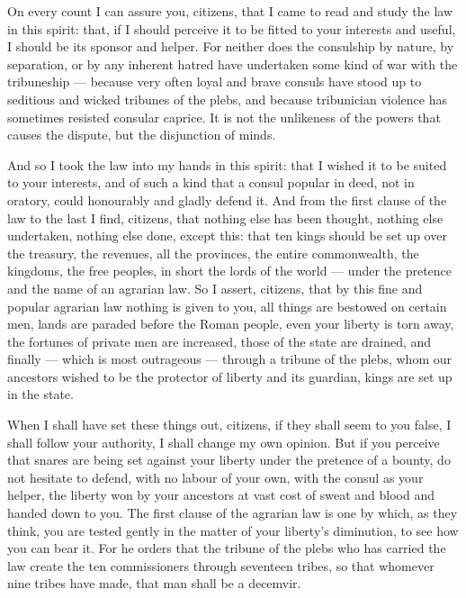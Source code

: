  On every count I can assure you, citizens, that I came to read and study the law in this spirit: that, if I should perceive it to be fitted to your interests and useful, I should be its sponsor and helper. For neither does the consulship by nature, by separation, or by any inherent hatred have undertaken some kind of war with the tribuneship --- because very often loyal and brave consuls have stood up to seditious and wicked tribunes of the plebs, and because tribunician violence has sometimes resisted consular caprice. It is not the unlikeness of the powers that causes the dispute, but the disjunction of minds.

 And so I took the law into my hands in this spirit: that I wished it to be suited to your interests, and of such a kind that a consul popular in deed, not in oratory, could honourably and gladly defend it. And from the first clause of the law to the last I find, citizens, that nothing else has been thought, nothing else undertaken, nothing else done, except this: that ten kings should be set up over the treasury, the revenues, all the provinces, the entire commonwealth, the kingdoms, the free peoples, in short the lords of the world --- under the pretence and the name of an agrarian law. So I assert, citizens, that by this fine and popular agrarian law nothing is given to you, all things are bestowed on certain men, lands are paraded before the Roman people, even your liberty is torn away, the fortunes of private men are increased, those of the state are drained, and finally --- which is most outrageous --- through a tribune of the plebs, whom our ancestors wished to be the protector of liberty and its guardian, kings are set up in the state.

 When I shall have set these things out, citizens, if they shall seem to you false, I shall follow your authority, I shall change my own opinion. But if you perceive that snares are being set against your liberty under the pretence of a bounty, do not hesitate to defend, with no labour of your own, with the consul as your helper, the liberty won by your ancestors at vast cost of sweat and blood and handed down to you. The first clause of the agrarian law is one by which, as they think, you are tested gently in the matter of your liberty's diminution, to see how you can bear it. For he orders that the tribune of the plebs who has carried the law create the ten commissioners through seventeen tribes, so that whomever nine tribes have made, that man shall be a decemvir.

